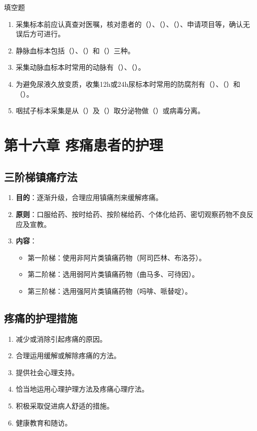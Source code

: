 \documentclass[11pt, a4paper]{ctexart}
\begin{document}
\begin{tipsbox}{填空题}
	\begin{enumerate}
		\item 采集标本前应认真查对医嘱，核对患者的（\qquad）、（\qquad）、（\qquad）、申请项目等，确认无误后方可进行。
		\item 静脉血标本包括（\qquad）、（\qquad）和（\qquad）三种。
		\item 采集动脉血标本时常用的动脉有（\qquad）、（\qquad）。
		\item 为避免尿液久放变质，收集12h或24h尿标本时常用的防腐剂有（\qquad）、（\qquad）和（\qquad）。
		\item 咽拭子标本采集是从（\qquad）及（\qquad）取分泌物做（\qquad）或病毒分离。
	\end{enumerate}
\end{tipsbox}

\section{第十六章 疼痛患者的护理}
\subsection{三阶梯镇痛疗法}
\begin{enumerate}
	\item \textbf{目的}：逐渐升级，合理应用镇痛剂来缓解疼痛。
	\item \textbf{原则}：口服给药、按时给药、按阶梯给药、个体化给药、密切观察药物不良反应及宣教。
	\item \textbf{内容}：
	      \begin{itemize}
		      \item 第一阶梯：使用非阿片类镇痛药物（阿司匹林、布洛芬）。
		      \item 第二阶梯：选用弱阿片类镇痛药物（曲马多、可待因）。
		      \item 第三阶梯：选用强阿片类镇痛药物（吗啡、哌替啶）。
	      \end{itemize}
\end{enumerate}

\subsection{疼痛的护理措施}
\begin{enumerate}
	\item 减少或消除引起疼痛的原因。
	\item 合理运用缓解或解除疼痛的方法。
	\item 提供社会心理支持。
	\item 恰当地运用心理护理方法及疼痛心理疗法。
	\item 积极采取促进病人舒适的措施。
	\item 健康教育和随访。
\end{enumerate}
\end{document}
